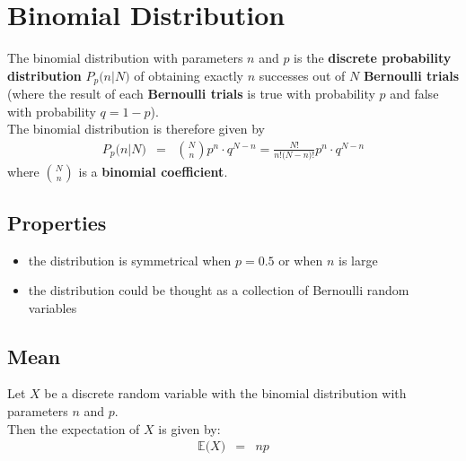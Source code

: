 \chapter{Binomial Distribution}
The binomial distribution with parameters $n$ and $p$ is the \textbf{\color{blue}discrete probability distribution} $P_{p}\big(n\bigr\rvert N\big)$ of obtaining exactly $n$ successes out of $N$ \textbf{\color{blue}Bernoulli trials} (where the result of each \textbf{\color{blue}Bernoulli trials} is true with probability $p$ and false with probability $q = 1 - p$).\\
The binomial distribution is therefore given by
\begin{eqnarray}
	P_{p}\big(n\bigr\rvert N\big) &=& {\binom{N}{n}}p^{n}\cdot q^{N - n} = \frac{N!}{n! \big(N - n\big)!}p^{n}\cdot q^{N - n}
\end{eqnarray}
where ${\binom{N}{n}}$ is a \textbf{\color{blue}binomial coefficient}.

\section{Properties}
\begin{itemize}
	\item the distribution is symmetrical when $p = 0.5$ or when $n$ is large
	\item the distribution could be thought as a collection of Bernoulli random variables
\end{itemize}

\section{Mean}
Let $X$ be a discrete random variable with the binomial distribution with parameters $n$ and $p$.\\
Then the expectation of $X$ is given by:
\begin{eqnarray}
	\mathbb{E}\big(X\big) &=& np
\end{eqnarray}

